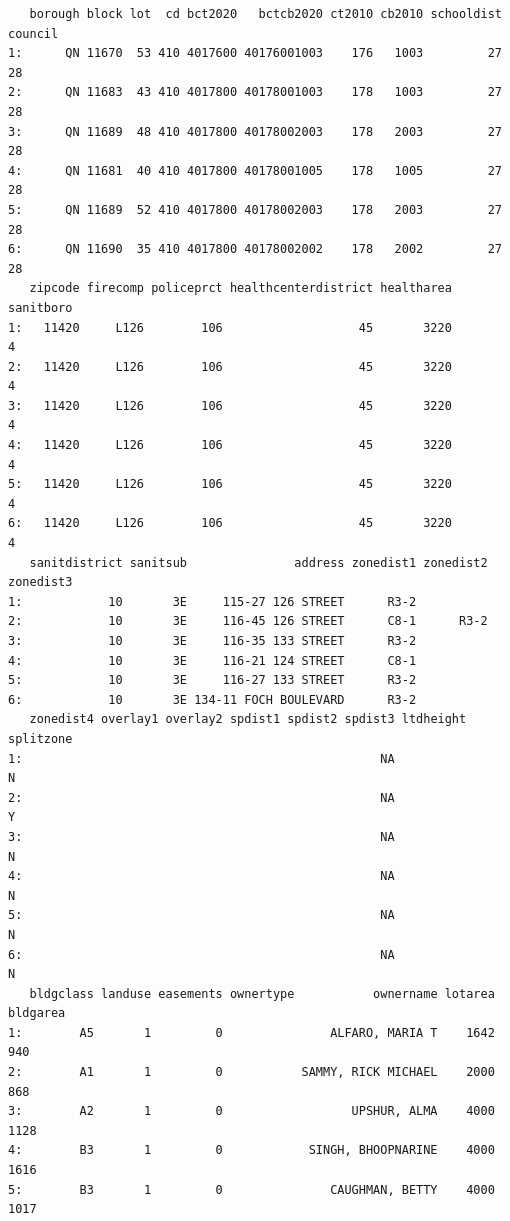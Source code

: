 \documentclass[
  letterpaper,
  DIV=11,
  numbers=noendperiod]{scrartcl}
\begin{document}
\begin{verbatim}
   borough block lot  cd bct2020   bctcb2020 ct2010 cb2010 schooldist council
1:      QN 11670  53 410 4017600 40176001003    176   1003         27      28
2:      QN 11683  43 410 4017800 40178001003    178   1003         27      28
3:      QN 11689  48 410 4017800 40178002003    178   2003         27      28
4:      QN 11681  40 410 4017800 40178001005    178   1005         27      28
5:      QN 11689  52 410 4017800 40178002003    178   2003         27      28
6:      QN 11690  35 410 4017800 40178002002    178   2002         27      28
   zipcode firecomp policeprct healthcenterdistrict healtharea sanitboro
1:   11420     L126        106                   45       3220         4
2:   11420     L126        106                   45       3220         4
3:   11420     L126        106                   45       3220         4
4:   11420     L126        106                   45       3220         4
5:   11420     L126        106                   45       3220         4
6:   11420     L126        106                   45       3220         4
   sanitdistrict sanitsub               address zonedist1 zonedist2 zonedist3
1:            10       3E     115-27 126 STREET      R3-2                    
2:            10       3E     116-45 126 STREET      C8-1      R3-2          
3:            10       3E     116-35 133 STREET      R3-2                    
4:            10       3E     116-21 124 STREET      C8-1                    
5:            10       3E     116-27 133 STREET      R3-2                    
6:            10       3E 134-11 FOCH BOULEVARD      R3-2                    
   zonedist4 overlay1 overlay2 spdist1 spdist2 spdist3 ltdheight splitzone
1:                                                  NA                   N
2:                                                  NA                   Y
3:                                                  NA                   N
4:                                                  NA                   N
5:                                                  NA                   N
6:                                                  NA                   N
   bldgclass landuse easements ownertype           ownername lotarea bldgarea
1:        A5       1         0               ALFARO, MARIA T    1642      940
2:        A1       1         0           SAMMY, RICK MICHAEL    2000      868
3:        A2       1         0                  UPSHUR, ALMA    4000     1128
4:        B3       1         0            SINGH, BHOOPNARINE    4000     1616
5:        B3       1         0               CAUGHMAN, BETTY    4000     1017

\end{verbatim}
\end{document}

